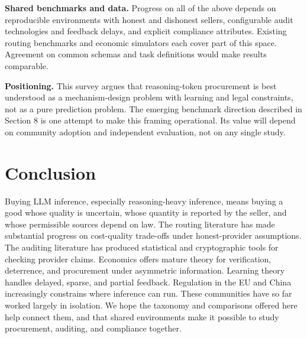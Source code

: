 \textbf{Shared benchmarks and data.} Progress on all of the above depends on reproducible environments with honest and dishonest sellers, configurable audit technologies and feedback delays, and explicit compliance attributes. Existing routing benchmarks \cite{hu2024routerbench} and economic simulators \cite{zheng2022aieconomist} each cover part of this space. Agreement on common schemas and task definitions would make results comparable.

\textbf{Positioning.} This survey argues that reasoning-token procurement is best understood as a mechanism-design problem with learning and legal constraints, not as a pure prediction problem. The emerging benchmark direction described in Section 8 is one attempt to make this framing operational. Its value will depend on community adoption and independent evaluation, not on any single study.

\section{Conclusion}\label{conclusion}

Buying LLM inference, especially reasoning-heavy inference, means buying a good whose quality is uncertain, whose quantity is reported by the seller, and whose permissible sources depend on law. The routing literature has made substantial progress on cost-quality trade-offs under honest-provider assumptions. The auditing literature has produced statistical and cryptographic tools for checking provider claims. Economics offers mature theory for verification, deterrence, and procurement under asymmetric information. Learning theory handles delayed, sparse, and partial feedback. Regulation in the EU and China increasingly constrains where inference can run. These communities have so far worked largely in isolation. We hope the taxonomy and comparisons offered here help connect them, and that shared environments make it possible to study procurement, auditing, and compliance together.
